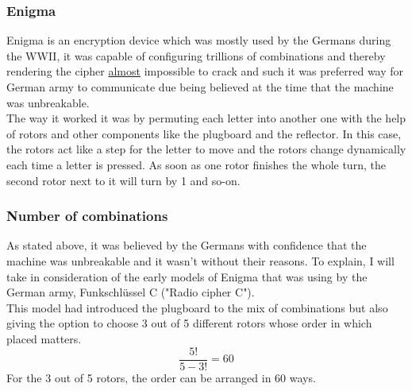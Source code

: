 \documentclass[conference,compsoc]{IEEEtran}
\begin{document}
\subsubsection{Enigma} Enigma is an encryption device which was mostly used by the Germans during the WWII, it was capable of configuring trillions of combinations and thereby rendering the cipher \underline{almost} impossible to crack and such it was preferred way for German army to communicate due being believed at the time that the machine was unbreakable.\\
The way it worked it was by permuting each letter into another one with the help of rotors and other components like the plugboard and the reflector. In this case, the rotors act like a step for the letter to move and the rotors change dynamically each time a letter is pressed. As soon as one rotor finishes the whole turn, the second rotor next to it will turn by 1 and so-on.\\

\subsubsection{Number of combinations}
As stated above, it was believed by the Germans with confidence that the machine was unbreakable and it wasn't without their reasons. To explain, I will take in consideration of the early models of Enigma that was using by the German army, Funkschlüssel C ("Radio cipher C").\\
This model had introduced the plugboard to the mix of combinations but also giving the option to choose 3 out of 5 different rotors whose order in which placed matters.\\
\begin{equation}
    \frac{5!}{5-3!}=60
\end{equation}
For the 3 out of 5 rotors, the order can be arranged in 60 ways.\\
\end{document}
